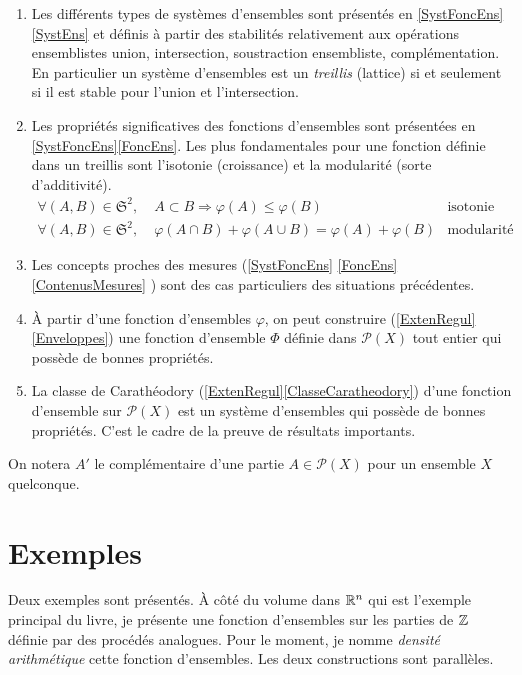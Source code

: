 \begin{enumerate}
 \item  Les différents types de systèmes d'ensembles sont présentés en \ref{SystFoncEns}\ref{SystEns} et définis à partir des stabilités relativement aux opérations ensemblistes union, intersection, soustraction ensembliste, complémentation.\newline
 En particulier un système d'ensembles est un \emph{treillis} (lattice) si et seulement si il est stable pour l'union et l'intersection.
 \item Les propriétés significatives des fonctions d'ensembles sont présentées en \ref{SystFoncEns}\ref{FoncEns}. Les plus fondamentales pour une fonction définie dans un treillis sont l'isotonie (croissance) et la modularité (sorte d'additivité).
 \begin{displaymath}
   \begin{aligned}
     \forall (A,B) \in \mathfrak{S}^2, \;& A \subset B \Rightarrow \varphi(A) \leq \varphi(B) &\text{isotonie}& \\
     \forall (A,B) \in \mathfrak{S}^2, \;&  \varphi(A\cap B) + \varphi(A \cup B) = \varphi(A) + \varphi(B) &\text{modularité}&
   \end{aligned}
 \end{displaymath}

 \item Les concepts proches des mesures (\ref{SystFoncEns} \ref{FoncEns} \ref{ContenusMesures} ) sont des cas particuliers des situations précédentes.
 \item À partir d'une fonction d'ensembles $\varphi$, on peut construire (\ref{ExtenRegul} \ref{Enveloppes}) une fonction d'ensemble $\Phi$ définie dans $\mathcal{P}(X)$ tout entier qui possède de bonnes propriétés.
 \item La classe de Carathéodory (\ref{ExtenRegul}\ref{ClasseCaratheodory}) d'une fonction d'ensemble sur $\mathcal{P}(X)$ est un système d'ensembles qui possède de bonnes propriétés. C'est le cadre de la preuve de résultats importants.
\end{enumerate}

On notera $A'$ le complémentaire d'une partie $A \in \mathcal{P}(X)$ pour un ensemble $X$ quelconque.
\newpage

\chapter{Exemples}\label{Chap:Exples}
Deux exemples sont présentés. À côté du volume dans $\mathbb{R}^n$ qui est l'exemple principal du livre, je présente une fonction d'ensembles sur les parties de $\mathbb{Z}$ définie par des procédés analogues. Pour le moment, je nomme \emph{densité arithmétique} cette fonction d'ensembles. Les deux constructions sont parallèles.

